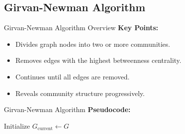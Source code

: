 \documentclass[compress]{beamer}
\begin{document}

\subsection{Girvan-Newman Algorithm}
\begin{frame}[t]{Girvan-Newman Algorithm Overview}
    \textbf{Key Points:}
    \begin{itemize}
        \item Divides graph nodes into two or more communities.
        \item Removes edges with the highest betweenness centrality.
        \item Continues until all edges are removed.
        \item Reveals community structure progressively.
    \end{itemize}
\end{frame}

\begin{frame}[t]{Girvan-Newman Algorithm}
    \vspace{0.5cm}
    \textbf{Pseudocode:}
    \begin{algorithm}[H]
        \caption{Girvan-Newman Algorithm}\label{alg:girvan_newman}
        Initialize $ G_{\text{current}} \leftarrow G $\;
    \end{algorithm}
\end{frame}
\end{document}
